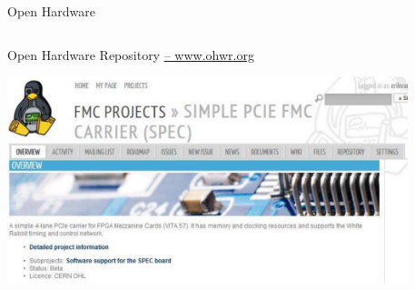 \documentclass[compress,red]{beamer}
\begin{document}
\begin{frame}{Open Hardware}
\begin{columns}[c]
  \end{columns}
\end{frame}
\begin{frame}{Open Hardware Repository \href{http://ohwr.org}{-- www.ohwr.org}}

 \begin{center}
   \includegraphics[height=6cm]{ohwr/ohr_spec_top.pdf}
 \end{center} 

\end{frame}
\end{document}
